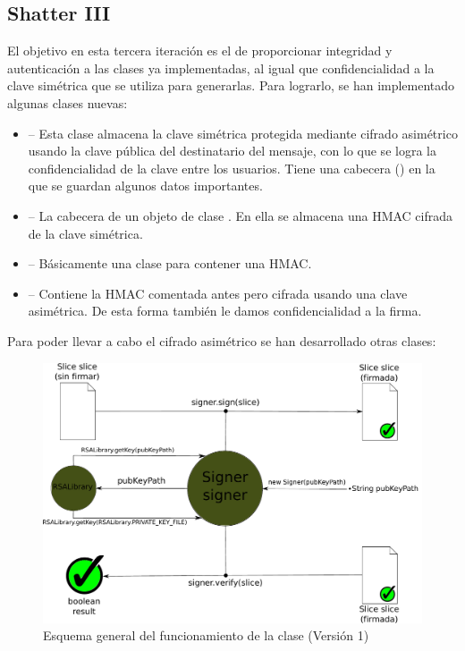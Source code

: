\subsection{Shatter III}

El objetivo en esta tercera iteración es el de proporcionar integridad y autenticación a las clases ya implementadas, al igual que confidencialidad a la clave simétrica que se utiliza para generarlas. Para lograrlo, se han implementado algunas clases nuevas:

\begin{itemize}
  \item {} -- Esta clase almacena la clave simétrica protegida mediante cifrado asimétrico usando la clave pública del destinatario del mensaje, con lo que se logra la confidencialidad de la clave entre los usuarios. Tiene una cabecera () en la que se guardan algunos datos importantes.

  \item {} -- La cabecera de un objeto de clase . En ella se almacena una HMAC cifrada de la clave simétrica.

  \item {} -- Básicamente una clase para contener una HMAC.

  \item {} -- Contiene la HMAC comentada antes pero cifrada usando una clave asimétrica. De esta forma también le damos confidencialidad a la firma.
\end{itemize}

Para poder llevar a cabo el cifrado asimétrico se han desarrollado otras clases:

\begin{figure}[!htb]
  \centering
  \includegraphics[scale=0.5]{Figures/Signer_1}
  \decoRule
  \caption[ (Versión 1)]{Esquema general del funcionamiento de la clase  (Versión 1)}
  \label{fig:Signer_1}
\end{figure}

